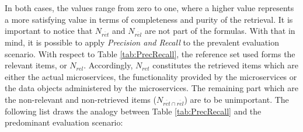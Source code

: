  
\noindent
In both cases, the values range from zero to one, where a higher value represents a more satisfying value in terms of completeness and purity of the retrieval.
It is important to notice that $N_{\overline{ret}}$ and $N_{\overline{rel}}$ are not part of the formulas. With that in mind, it is possible to apply \textit{Precision and Recall} to the prevalent evaluation scenario. With respect to Table \ref{tab:PrecRecall}, the reference set used forms the relevant items, or $N_{rel}$. Accordingly, $N_{ret}$ constitutes the retrieved items which are either the actual microservices, the functionality provided by the microservices or the data objects administered by the microservices.
The remaining part which are the non-relevant and non-retrieved items ($N_{\overline{ret}\cap \overline{rel}}$) are to be unimportant. The following list draws the analogy between Table \ref{tab:PrecRecall} and the predominant evaluation scenario:
